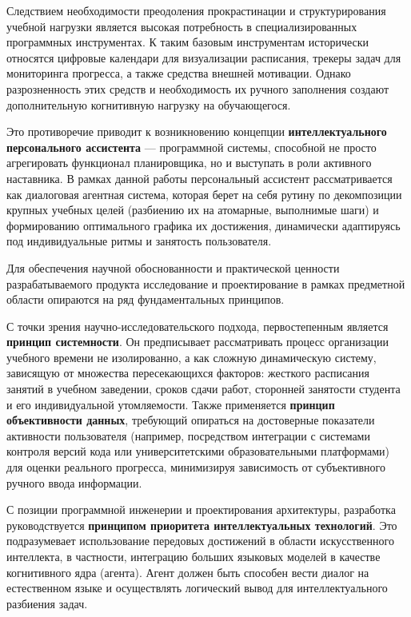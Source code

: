 Следствием необходимости преодоления прокрастинации и структурирования учебной нагрузки является высокая потребность в специализированных программных инструментах. К таким базовым инструментам исторически относятся цифровые календари для визуализации расписания, трекеры задач для мониторинга прогресса, а также средства внешней мотивации. Однако разрозненность этих средств и необходимость их ручного заполнения создают дополнительную когнитивную нагрузку на обучающегося.

Это противоречие приводит к возникновению концепции \textbf{интеллектуального персонального ассистента} — программной системы, способной не просто агрегировать функционал планировщика, но и выступать в роли активного наставника. В рамках данной работы персональный ассистент рассматривается как диалоговая агентная система, которая берет на себя рутину по декомпозиции крупных учебных целей (разбиению их на атомарные, выполнимые шаги) и формированию оптимального графика их достижения, динамически адаптируясь под индивидуальные ритмы и занятость пользователя.


\numberedparagraph
Для обеспечения научной обоснованности и практической ценности разрабатываемого продукта исследование и проектирование в рамках предметной области опираются на ряд фундаментальных принципов.

С точки зрения научно-исследовательского подхода, первостепенным является \textbf{принцип системности}. Он предписывает рассматривать процесс организации учебного времени не изолированно, а как сложную динамическую систему, зависящую от множества пересекающихся факторов: жесткого расписания занятий в учебном заведении, сроков сдачи работ, сторонней занятости студента и его индивидуальной утомляемости. Также применяется \textbf{принцип объективности данных}, требующий опираться на достоверные показатели активности пользователя (например, посредством интеграции с системами контроля версий кода или университетскими образовательными платформами) для оценки реального прогресса, минимизируя зависимость от субъективного ручного ввода информации.

С позиции программной инженерии и проектирования архитектуры, разработка руководствуется \textbf{принципом приоритета интеллектуальных технологий}. Это подразумевает использование передовых достижений в области искусственного интеллекта, в частности, интеграцию больших языковых моделей в качестве когнитивного ядра (агента). Агент должен быть способен вести диалог на естественном языке и осуществлять логический вывод для интеллектуального разбиения задач.

